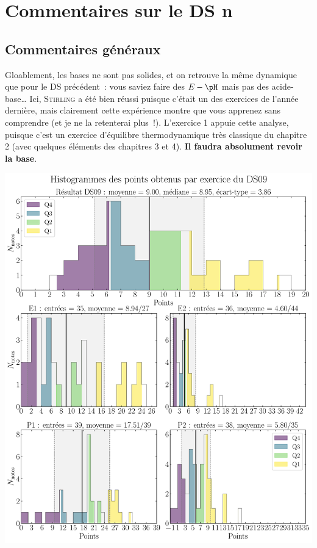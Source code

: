 \documentclass[a4paper, 11pt, final, garamond]{book}
\begin{document}
\setcounter{chapter}{8}

\def\lspace{25}

\chapter{Commentaires sur le DS n}
\section{Commentaires généraux}

Gloablement, les bases ne sont pas solides, et on retrouve la même dynamique que
pour le DS précédent~: vous saviez faire des $E-\pH$ mais pas des acide-base…
Ici, \textsc{Stirling} a été bien réussi puisque c'était un des exercices de
l'année dernière, mais clairement cette expérience montre que vous apprenez sans
comprendre (et je ne la retenterai plus~!). L'exercice 1 appuie cette analyse,
puisque c'est un exercice d'équilibre thermodynamique très classique du chapitre
2 (avec quelques éléments des chapitres 3 et 4). \textbf{Il faudra absolument
	revoir la base}.

\begin{center}
	\includegraphics[width=.9\linewidth]{DS09_hist_all}
\end{center}
\end{document}
